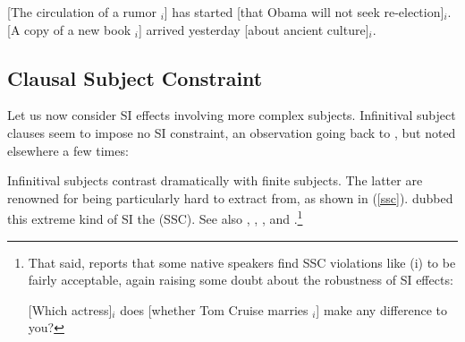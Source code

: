 \documentclass[output=paper,biblatex,babelshorthands,newtxmath,draftmode,colorlinks,citecolor=brown]{langscibook}
\begin{document}
\eal \label{subxxx}
\ex {}[The circulation of a rumor \trace$_i$] has started [that Obama will not seek re-election]$_i$.
\ex {}[A  copy of a new book \trace$_i$] arrived yesterday [about ancient  culture]$_i$.

\zl


\subsection{Clausal Subject Constraint}

Let us now consider SI effects involving more complex subjects.  Infinitival subject clauses seem to
impose no SI constraint, an observation going back to \citet{kunotakamib}, but noted elsewhere a few
times:

\eal \label{vpsi}


\zl

\noindent
Infinitival subjects contrast dramatically with finite subjects. The latter are renowned for being
particularly hard to extract from, as shown in (\ref{ssc}).  \citet[]{Ross67} dubbed this extreme kind
of SI the  (SSC). See also \citet{chomsky73}, \citet{huang82},
\citet{Chomsky86b}, and \citet{freidin92}.\footnote{That said, \citet{chavessubj} reports that some
  native speakers find SSC violations like (i) to be fairly acceptable, again raising some doubt
  about the robustness of  SI effects:

\ea
{}[Which actress]$_i$ does [whether Tom Cruise marries \trace$_i$] make any difference to you?
\zlast
}
\end{document}
